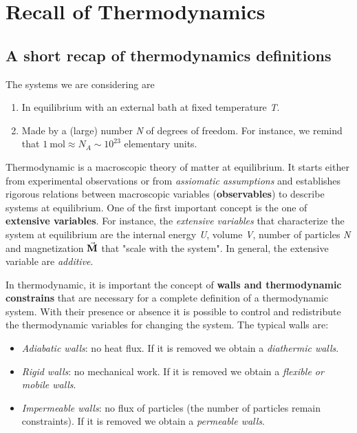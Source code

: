 \documentclass[../main/main.tex]{subfiles}
\begin{document}
\chapter{Recall of Thermodynamics}


\section{A short recap of thermodynamics definitions}
\noindent The systems we are considering are

\begin{enumerate}
\item In equilibrium with an external bath at fixed temperature \emph{T}.
\item Made by a (large) number \emph{N} of degrees of freedom. For instance, we remind that \( \SI{1}{\mole} \approx N_A \sim 10^{23}\) elementary units.
\end{enumerate}

\noindent Thermodynamic is a macroscopic theory of matter at equilibrium.
It starts either from experimental observations or from \emph{assiomatic assumptions} and establishes rigorous relations between macroscopic variables (\textbf{observables}) to describe systems at equilibrium.
One of the first important concept is the one of \textbf{extensive variables}. For instance, the  \emph{extensive variables} that characterize the system at equilibrium are the internal energy \emph{U}, volume \emph{V}, number of particles \emph{N} and magnetization \( \va{M} \) that "scale with the system".
In general, the extensive variable are \emph{additive}.

In thermodynamic, it is important the concept of \textbf{walls and thermodynamic constrains} that are necessary for a complete definition of a thermodynamic system. With their presence or absence it is possible to control and redistribute the thermodynamic variables for changing the system.
The typical walls are:
\begin{itemize}
\item \textit{Adiabatic walls}: no heat flux. If it is removed we obtain a \textit{diathermic walls}.
\item \textit{Rigid walls}: no mechanical work. If it is removed we obtain a \textit{flexible or mobile walls}.
\item \textit{Impermeable walls}: no flux of particles (the number of particles remain constraints). If it is removed we obtain a \textit{permeable walls}.
\end{itemize}
\end{document}
